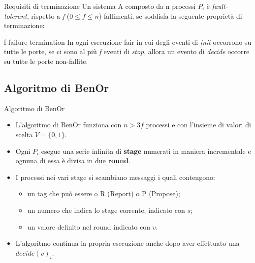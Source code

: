 \documentclass{beamer}
\begin{document}
    \begin{frame}{Requisiti di terminazione}
        Un sistema A composto da n processi $P_{i}$ è \textit{fault-tolerant}, rispetto a \textit{f} ($0 \leq f \leq n$) fallimenti, se soddisfa la seguente proprietà di terminazione:
        \begin{block}{f-failure termination}
            In ogni esecuzione fair in cui degli eventi di \textit{init} occorrono su tutte le porte, se ci sono al più \textit{f} eventi di \textit{stop}, allora un evento di \textit{decide} occorre su tutte le porte non-fallite.
        \end{block}
    \end{frame}

    \subsection{Algoritmo di BenOr}
    \begin{frame}{Algoritmo di BenOr}
        \begin{itemize}
            \item L'algoritmo di BenOr funziona con $n > 3f$ processi e con l'insieme di valori di scelta $V = \{0, 1\}$.

            \item Ogni $P_{i}$ esegue una serie infinita di \textbf{stage} numerati in maniera incrementale e ognuna di essa è divisa in due \textbf{round}.

            \item I processi nei vari stage si scambiano messaggi i quali contengono:
            \begin{itemize}
                \item un tag che può essere o R (Report) o P (Propose);
                \item un numero che indica lo stage corrente, indicato con $s$;
                \item un valore definito nel round indicato con $v$.
            \end{itemize}

            \item L'algoritmo continua la propria esecuzione anche dopo aver effettuato una $decide(v)_i$.
        \end{itemize}
    \end{frame}
\end{document}
